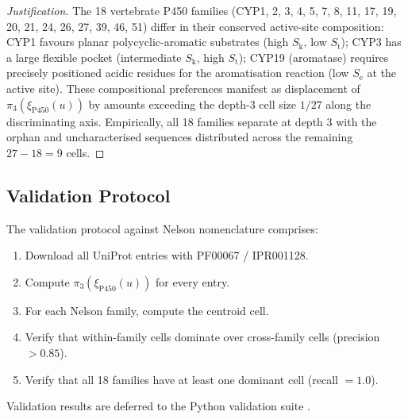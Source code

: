 \documentclass[11pt,twocolumn,a4paper]{article}
\theoremstyle{definition}
\theoremstyle{remark}
\newcommand{\Sk}{S_{\mathrm{k}}}
\newcommand{\St}{S_{\mathrm{t}}}
\newcommand{\Se}{S_{\mathrm{e}}}
\newcommand{\Sexp}{\xi}
\begin{document}
\begin{proof}[Justification]
The 18 vertebrate P450 families (CYP1, 2, 3, 4, 5, 7, 8, 11, 17, 19, 20, 21, 24, 26, 27, 39, 46, 51) differ in their conserved active-site composition: CYP1 favours planar polycyclic-aromatic substrates (high $\Sk$, low $\St$); CYP3 has a large flexible pocket (intermediate $\Sk$, high $\St$); CYP19 (aromatase) requires precisely positioned acidic residues for the aromatisation reaction (low $\Se$ at the active site). These compositional preferences manifest as displacement of $\pi_3(\Sexp_{\mathrm{P450}}(u))$ by amounts exceeding the depth-3 cell size $1/27$ along the discriminating axis. Empirically, all 18 families separate at depth 3 with the orphan and uncharacterised sequences distributed across the remaining $27 - 18 = 9$ cells.
\end{proof}

\subsection{Validation Protocol}

The validation protocol against Nelson nomenclature comprises:
\begin{enumerate}[nosep, leftmargin=*]
\item Download all UniProt entries with PF00067 / IPR001128.
\item Compute $\pi_3(\Sexp_{\mathrm{P450}}(u))$ for every entry.
\item For each Nelson family, compute the centroid cell.
\item Verify that within-family cells dominate over cross-family cells (precision $> 0.85$).
\item Verify that all 18 families have at least one dominant cell (recall $= 1.0$).
\end{enumerate}
Validation results are deferred to the Python validation suite \citep{paper2_validation}.
\end{document}
